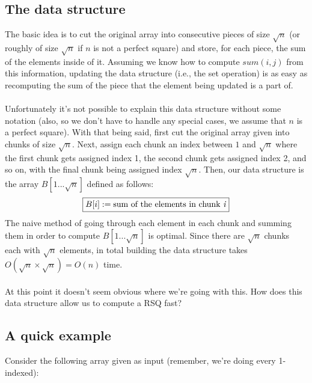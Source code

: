 \documentclass[11pt]{article}
\theoremstyle{plain}
\theoremstyle{definition}
\begin{document}
\subsection{The data structure}
The basic idea is to cut the original array into consecutive pieces of size $\sqrt{n}$ (or roughly of size $\sqrt{n}$ if $n$ is not a perfect square) and store, for each piece, the sum of the elements inside of it. Assuming we know how to compute $sum(i, j)$ from this information, updating the data structure (i.e., the set operation) is as easy as recomputing the sum of the piece that the element being updated is a part of.\\\\
Unfortunately it's not possible to explain this data structure without some notation (also, so we don't have to handle any special cases, we assume that $n$ is a perfect square). With that being said, first cut the original array given into chunks of size $\sqrt{n}$. Next, assign each chunk an index between $1$ and $\sqrt{n}$ where the first chunk gets assigned index 1, the second chunk gets assigned index 2, and so on, with the final chunk being assigned index $\sqrt{n}$. Then, our data structure is the array $B[1...\sqrt{n}]$ defined as follows:
$$\boxed{B[i] := \text{sum of the elements in chunk \emph{i}}}$$ The naive method of going through each element in each chunk and summing them in order to compute $B[1...\sqrt{n}]$ is optimal. Since there are $\sqrt{n}$ chunks each with $\sqrt{n}$ elements, in total building the data structure takes $O(\sqrt{n} \times \sqrt{n}) = O(n)$ time.\\\\
At this point it doesn't seem obvious where we're going with this. How does this data structure allow us to compute a RSQ fast?
\subsection{A quick example}
Consider the following array given as input (remember, we're doing every 1-indexed):
\end{document}
